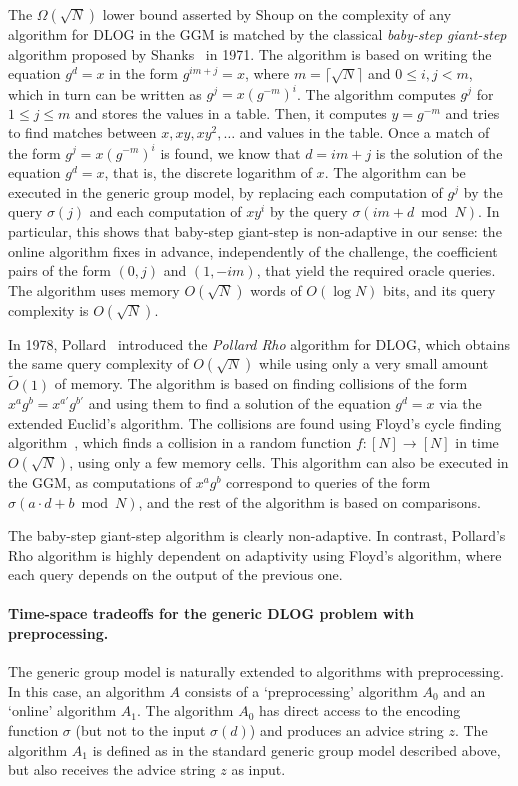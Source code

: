 \documentclass[11pt]{article}
\begin{document}
The $\Omega(\sqrt{N})$ lower bound asserted by Shoup on the complexity of any algorithm for DLOG in the GGM is matched by the classical \emph{baby-step giant-step} algorithm proposed by Shanks~\cite{Shanks71} in 1971. The algorithm is based on writing the equation $g^d=x$ in the form $g^{im+j}=x$, where $m=\lceil \sqrt{N} \rceil$ and $0 \leq i,j < m$, which in turn can be written as $g^j=x(g^{-m})^i$. The algorithm computes $g^j$ for $1 \leq j \leq m$ and stores the values in a table. Then, it computes $y=g^{-m}$ and tries to find matches between $x, xy, xy^2, \ldots$ and values in the table. Once a match of the form $g^j=x(g^{-m})^i$ is found, we know that $d=im+j$ is the solution of the equation $g^d=x$, that is, the discrete logarithm of $x$. The algorithm can be executed in the generic group model, by replacing each computation of $g^j$ by the query $\sigma(j)$ and each computation of $xy^i$ by the query $\sigma(im+d \bmod N)$. In particular, this shows that baby-step giant-step is non-adaptive in our sense: the online algorithm fixes in advance, independently of the challenge, the coefficient pairs of the form $(0,j)$ and $(1,-im)$, that yield the required oracle queries. The algorithm uses memory $O(\sqrt{N})$ words of $O(\log N)$ bits, and its query complexity is $O(\sqrt{N})$. 

In 1978, Pollard~\cite{Pollard78} introduced the \emph{Pollard Rho} algorithm for DLOG, which obtains the same query complexity of $O(\sqrt{N})$ while using only a very small amount $\tilde{O}(1)$ of memory. The algorithm is based on finding collisions of the form $x^a g^b = x^{a'} g^{b'}$ and using them to find a solution of the equation $g^d=x$ via the extended Euclid's algorithm. The collisions are found using Floyd's cycle finding algorithm~\cite{Knuth69}, which finds a collision in a random function $f:[N] \to [N]$ in time $O(\sqrt{N})$, using only a few memory cells. This algorithm can also be executed in the GGM, as computations of $x^a g^b$ correspond to queries of the form $\sigma(a \cdot d + b \bmod N)$, and the rest of the algorithm is based on comparisons.

The baby-step giant-step algorithm is clearly non-adaptive. In contrast, Pollard’s Rho algorithm is highly dependent on adaptivity using Floyd's algorithm, where each query depends on the output of the previous one.



\paragraph{Time-space tradeoffs for the generic DLOG problem with preprocessing.} The generic group model is naturally extended to algorithms with preprocessing. In this case, an algorithm $A$ consists of a `preprocessing' algorithm $A_0$ and an `online' algorithm $A_1$. The algorithm $A_0$ has direct access to the encoding function $\sigma$ (but not to the input $\sigma(d)$) and produces an advice string $z$. 
The algorithm $A_1$ is defined as in the standard generic group model described above, but also receives the advice string $z$ as input. 
 
\end{document}
